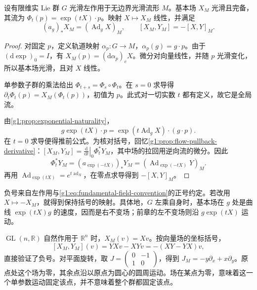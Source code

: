 \begin{proposition}\label{g1:prop:fundamental-fields}
	设有限维实 Lie 群 \(G\) 光滑左作用于无边界光滑流形 \(M\)。基本场 \(X_M\) 光滑且完备，其流为 \(\Phi_t(p)=\exp(tX)\cdot p\)。映射 \(X\mapsto X_M\) 线性，并满足
	\begin{equation}\label{g1:eq:fundamental-field-pushforward-bracket}
		(a_g)_*X_M=(\operatorname{Ad}_gX)_M,
		\qquad [X_M,Y_M]=-[X,Y]_M.
	\end{equation}
\end{proposition}
\begin{proof}
	对固定 \(p\)，定义轨道映射 \(\alpha_p:G\to M\)，\(\alpha_p(g)=g\cdot p\)。由于 \((\mathrm{d}\exp)_0=I\)，有 \(X_M(p)=(\mathrm{d}\alpha_p)_eX\)。微分对向量线性，并随 \(p\) 光滑变化，所以基本场光滑，且对 \(X\) 线性。

	单参数子群的乘法给出 \(\Phi_{t+s}=\Phi_s\circ\Phi_t\)。在 \(s=0\) 求导得 \(\partial_t\Phi_t(p)=X_M(\Phi_t(p))\)，初值为 \(p\)。此式对一切实数 \(t\) 都有定义，故它是全局流。

	由\cref{g1:prop:exponential-naturality}，
	\[
		g\exp(tX)\cdot p=\exp(t\operatorname{Ad}_gX)\cdot(g\cdot p).
	\]
	在 \(t=0\) 求导便得推前公式。为核对括号，回忆\cref{g1:prop:flow-pullback-derivative}：\([X_M,Y_M]=\left.\frac{\mathrm{d}}{\mathrm{d}t}\right|_0\Phi_t^*Y_M\)，其中场的拉回用逆向流的微分。因此
	\[
		\Phi_t^*Y_M=(a_{\exp(-tX)})_*Y_M
		=(\operatorname{Ad}_{\exp(-tX)}Y)_M.
	\]
	再用 \(\operatorname{Ad}_{\exp(tX)}=e^{t\operatorname{ad}_X}\)，在零点求导得到 \(-[X,Y]_M\)。
\end{proof}

负号来自左作用与\eqref{g1:eq:fundamental-field-convention}的正号约定。若改用 \(X\mapsto-X_M\)，就得到保持括号的映射。具体地，\(G\) 左乘自身时，基本场在 \(g\) 处是曲线 \(\exp(tX)g\) 的速度，因而是右不变场；前章的左不变场则沿 \(g\exp(tX)\) 运动。

\begin{example}\label{g1:exm:linear-action-fundamental}
	\(\operatorname{GL}(n,\mathbb R)\) 自然作用于 \(\mathbb R^n\) 时，\(X_M(v)=Xv\)。按向量场的坐标括号，
	\[
		[X_M,Y_M](v)=YXv-XYv=-(XY-YX)v,
	\]
	直接验证了负号。对平面旋转，取 \(J=\begin{pmatrix}0&-1\\1&0\end{pmatrix}\)，得到 \(J_M=-y\partial_x+x\partial_y\)。原点处这个场为零，其余点沿以原点为圆心的圆周运动。场在某点为零，意味着这一个单参数运动固定该点，并不意味着整个群都固定该点。
\end{example}

